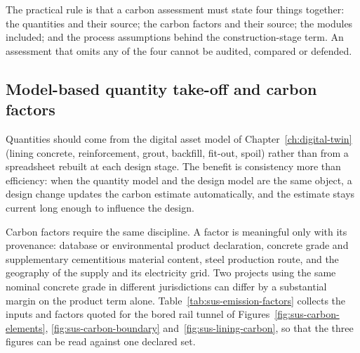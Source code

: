 The practical rule is that a carbon assessment must state four things
together: the quantities and their source; the carbon factors and their
source; the modules included; and the process assumptions behind the construction-stage
term. An assessment that omits any of the four cannot be audited, compared or
defended.

\subsection{Model-based quantity take-off and carbon factors}
\label{sec:model-based-carbon}

Quantities should come from the digital asset model of
Chapter~\ref{ch:digital-twin} (lining concrete, reinforcement, grout,
backfill, fit-out, spoil) rather than from a spreadsheet rebuilt at each
design stage. The benefit is consistency more than efficiency: when the quantity
model and the design model are the same object, a design change updates the
carbon estimate automatically, and the estimate stays current long enough to
influence the design.

Carbon factors require the same discipline. A factor is meaningful only with
its provenance: database or environmental product declaration, concrete grade
and supplementary cementitious material content, steel production route, and
the geography of the supply and its electricity grid. Two projects using the
same nominal concrete grade in different jurisdictions can differ by a
substantial margin on the product term alone.
Table~\ref{tab:sus-emission-factors} collects the inputs and factors quoted
for the bored rail tunnel of Figures~\ref{fig:sus-carbon-elements},
\ref{fig:sus-carbon-boundary} and~\ref{fig:sus-lining-carbon}, so that the
three figures can be read against one declared set.

